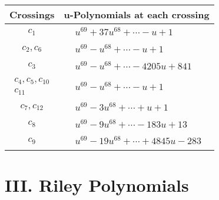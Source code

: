 \documentclass[1p]{elsarticle_modified}
\theoremstyle{definition}
\begin{document}
\begin{tabular}{m{50pt}|m{274pt}}
Crossings & \hspace{64pt}u-Polynomials at each crossing \\
\hline $$\begin{aligned}c_{1}\end{aligned}$$&$\begin{aligned}
&u^{69}+37 u^{68}+\cdots- u+1
\end{aligned}$\\
\hline $$\begin{aligned}c_{2},c_{6}\end{aligned}$$&$\begin{aligned}
&u^{69}- u^{68}+\cdots- u+1
\end{aligned}$\\
\hline $$\begin{aligned}c_{3}\end{aligned}$$&$\begin{aligned}
&u^{69}- u^{68}+\cdots-4205 u+841
\end{aligned}$\\
\hline $$\begin{aligned}c_{4},c_{5},c_{10}\\c_{11}\end{aligned}$$&$\begin{aligned}
&u^{69}- u^{68}+\cdots- u+1
\end{aligned}$\\
\hline $$\begin{aligned}c_{7},c_{12}\end{aligned}$$&$\begin{aligned}
&u^{69}-3 u^{68}+\cdots+u+1
\end{aligned}$\\
\hline $$\begin{aligned}c_{8}\end{aligned}$$&$\begin{aligned}
&u^{69}-9 u^{68}+\cdots-183 u+13
\end{aligned}$\\
\hline $$\begin{aligned}c_{9}\end{aligned}$$&$\begin{aligned}
&u^{69}-19 u^{68}+\cdots+4845 u-283
\end{aligned}$\\
\hline
\end{tabular}\newpage\renewcommand{\arraystretch}{1}
\centering \section*{ III. Riley Polynomials}
\end{document}
